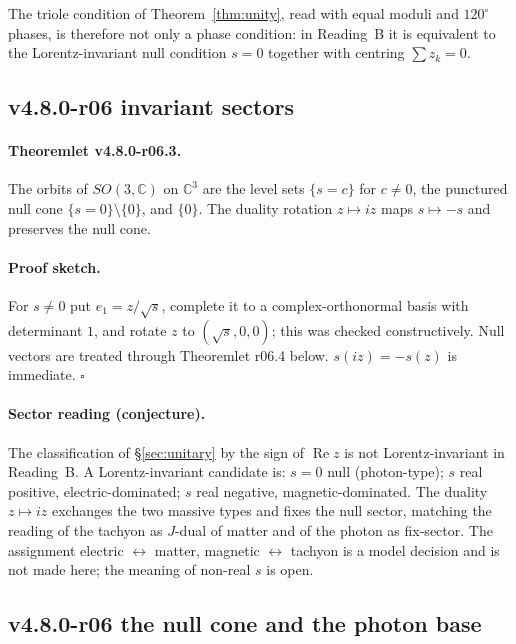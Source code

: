 The triole condition of Theorem~\ref{thm:unity}, read with equal moduli and \(120^\circ\) phases,
is therefore not only a phase condition: in Reading~B it is equivalent to the Lorentz-invariant
null condition \(s=0\) together with centring \(\sum z_k=0\).

\subsection*{v4.8.0-r06 invariant sectors}
\label{subsec:v480-r06-sectors}

\paragraph{Theoremlet v4.8.0-r06.3.}
The orbits of \(SO(3,\mathbb C)\) on \(\mathbb C^3\) are the level sets \(\{s=c\}\) for \(c\neq0\),
the punctured null cone \(\{s=0\}\setminus\{0\}\), and \(\{0\}\).  The duality rotation
\(z\mapsto iz\) maps \(s\mapsto-s\) and preserves the null cone.

\paragraph{Proof sketch.}
For \(s\neq0\) put \(e_1=z/\sqrt s\), complete it to a complex-orthonormal basis with determinant
\(1\), and rotate \(z\) to \((\sqrt s,0,0)\); this was checked constructively.  Null vectors are
treated through Theoremlet r06.4 below.  \(s(iz)=-s(z)\) is immediate.  \(\square\)

\paragraph{Sector reading (conjecture).}
The classification of \S\ref{sec:unitary} by the sign of \(\operatorname{Re}z\) is not
Lorentz-invariant in Reading~B.  A Lorentz-invariant candidate is: \(s=0\) null (photon-type);
\(s\) real positive, electric-dominated; \(s\) real negative, magnetic-dominated.  The duality
\(z\mapsto iz\) exchanges the two massive types and fixes the null sector, matching the reading of
the tachyon as \(J\)-dual of matter and of the photon as fix-sector.  The assignment
electric \(\leftrightarrow\) matter, magnetic \(\leftrightarrow\) tachyon is a model decision and is
not made here; the meaning of non-real \(s\) is open.

\subsection*{v4.8.0-r06 the null cone and the photon base}
\label{subsec:v480-r06-null-cone}


